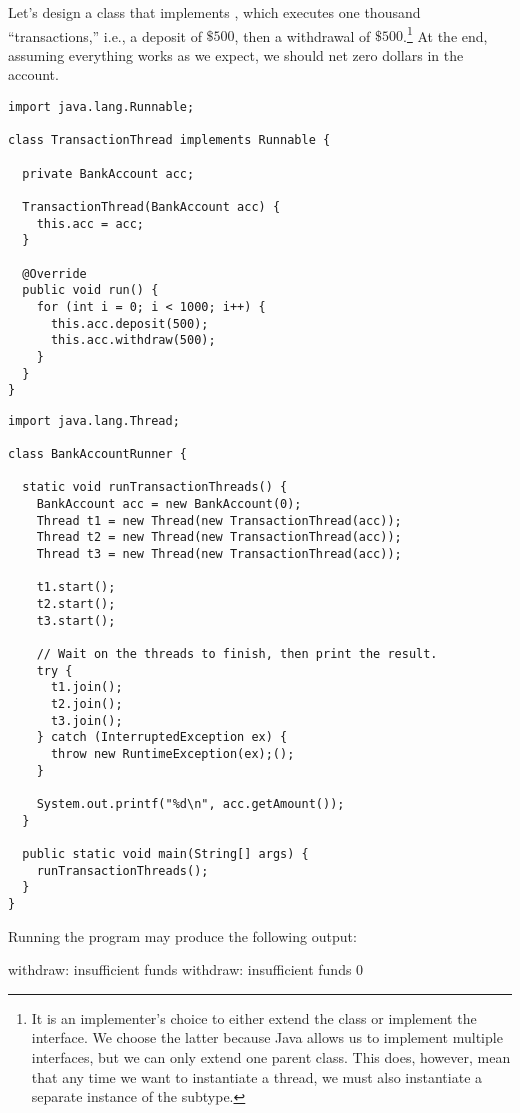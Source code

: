 Let's design a  class that implements , which executes one thousand ``transactions,'' i.e., a deposit of $\$500$, then a withdrawal of $\$500$.\footnote{It is an implementer's choice to either extend the  class or implement the  interface. We choose the latter because Java allows us to implement multiple interfaces, but we can only extend one parent class. This does, however, mean that any time we want to instantiate a thread, we must also instantiate a separate instance of the  subtype.} 
At the end, assuming everything works as we expect, we should net zero dollars in the account.

\enlargethispage{1\baselineskip}
\begin{lstlisting}[language=MyJava]
import java.lang.Runnable;

class TransactionThread implements Runnable {

  private BankAccount acc;

  TransactionThread(BankAccount acc) { 
    this.acc = acc; 
  }

  @Override
  public void run() {
    for (int i = 0; i < 1000; i++) {
      this.acc.deposit(500);
      this.acc.withdraw(500);
    }
  }
}
\end{lstlisting}

\begin{lstlisting}[language=MyJava]
import java.lang.Thread;

class BankAccountRunner {

  static void runTransactionThreads() {
    BankAccount acc = new BankAccount(0);
    Thread t1 = new Thread(new TransactionThread(acc));
    Thread t2 = new Thread(new TransactionThread(acc));
    Thread t3 = new Thread(new TransactionThread(acc));

    t1.start();
    t2.start();
    t3.start();

    // Wait on the threads to finish, then print the result.
    try {
      t1.join();
      t2.join();
      t3.join();
    } catch (InterruptedException ex) { 
      throw new RuntimeException(ex);(); 
    }

    System.out.printf("%d\n", acc.getAmount());
  }

  public static void main(String[] args) {
    runTransactionThreads();
  }
}
\end{lstlisting}

Running the program may produce the following output:

\begin{verbnobox}[\small]
withdraw: insufficient funds
withdraw: insufficient funds
0
\end{verbnobox}

